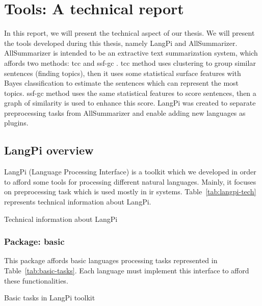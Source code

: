 \chapter{Tools: A technical report}

In this report, we will present the technical aspect of our thesis. 
We will present the tools developed during this thesis, namely LangPi and AllSummarizer. 
AllSummarizer is intended to be an extractive text summarization system, which affords two methods: \ac{tcc} \citep{13-aries-al,15-aries-al} and \ac{ssf-gc} \citep{18-aries-al,21-aries-al}.
\ac{tcc} method uses clustering to group similar sentences (finding topics), then it uses some statistical surface features with Bayes classification to estimate the sentences which can represent the most topics. 
\ac{ssf-gc} method uses the same statistical features to score sentences, then a graph of similarity is used to enhance this score.
LangPi was created to separate preprocessing tasks from AllSummarizer and enable adding new languages as plugins. 

 
\section{LangPi overview}

LangPi (Language Processing Interface) is a toolkit which we developed in order to afford some tools for processing different natural languages. 
Mainly, it focuses on preprocessing task which is used mostly in \ac{ir} systems. 
Table~\ref{tab:langpi-tech} represents technical information about LangPi. 

\begin{table}[!ht]
	\centering
	\caption{Technical information about LangPi}
	\label{tab:langpi-tech}
\end{table}


\subsection{Package: basic} 

This package affords basic languages processing tasks represented in Table~\ref{tab:basic-tasks}.
Each language must implement this interface to afford these functionalities.

\begin{table}[!ht]
	\centering
	\caption{Basic tasks in LangPi toolkit}
	\label{tab:basic-tasks}
\end{table}


